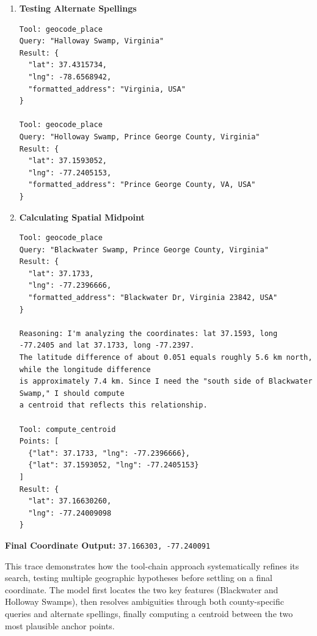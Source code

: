 \begin{enumerate}
\begin{lstlisting}
Reasoning: I found the coordinates 37.1733, -77.2397, which might be along Blackwater Dr, near Waverly. 
But I noticed the coordinates for Holloway Swamp at 36.9058, which is in southwestern Sussex, 
so there's a mismatch. It's possible there could be two features named Holloway Swamp.
\end{lstlisting}
\item
  \textbf{Testing Alternate Spellings}

\begin{lstlisting}
Tool: geocode_place
Query: "Halloway Swamp, Virginia"
Result: {
  "lat": 37.4315734, 
  "lng": -78.6568942, 
  "formatted_address": "Virginia, USA"
}

Tool: geocode_place
Query: "Holloway Swamp, Prince George County, Virginia"
Result: {
  "lat": 37.1593052, 
  "lng": -77.2405153, 
  "formatted_address": "Prince George County, VA, USA"
}
\end{lstlisting}
\item
  \textbf{Calculating Spatial Midpoint}

\begin{lstlisting}
Tool: geocode_place
Query: "Blackwater Swamp, Prince George County, Virginia"
Result: {
  "lat": 37.1733, 
  "lng": -77.2396666, 
  "formatted_address": "Blackwater Dr, Virginia 23842, USA"
}

Reasoning: I'm analyzing the coordinates: lat 37.1593, long -77.2405 and lat 37.1733, long -77.2397.
The latitude difference of about 0.051 equals roughly 5.6 km north, while the longitude difference
is approximately 7.4 km. Since I need the "south side of Blackwater Swamp," I should compute
a centroid that reflects this relationship.

Tool: compute_centroid
Points: [
  {"lat": 37.1733, "lng": -77.2396666}, 
  {"lat": 37.1593052, "lng": -77.2405153}
]
Result: {
  "lat": 37.16630260, 
  "lng": -77.24009098
}
\end{lstlisting}
\end{enumerate}

\textbf{Final Coordinate Output:}
\passthrough{\lstinline!37.166303, -77.240091!}

This trace demonstrates how the tool-chain approach systematically
refines its search, testing multiple geographic hypotheses before
settling on a final coordinate. The model first locates the two key
features (Blackwater and Holloway Swamps), then resolves ambiguities
through both county-specific queries and alternate spellings, finally
computing a centroid between the two most plausible anchor points.

